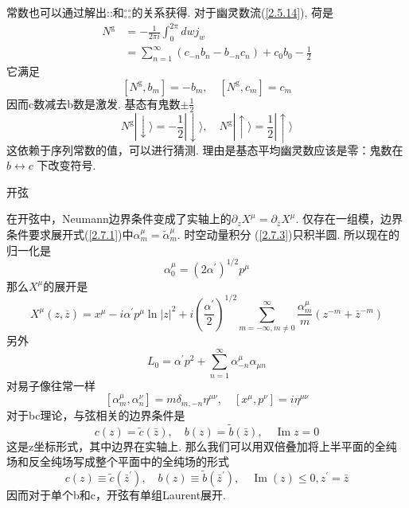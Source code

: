 常数也可以通过解出::和${}_\circ^\circ {}_\circ^\circ$的关系获得. 对于幽灵数流(\ref{2.5.14}),  荷是
\begin{equation}\label{2.7.22}
\begin{aligned}
N^{\mathrm{g}} &=-\frac{1}{2 \pi i} \int_{0}^{2 \pi} d w j_{w} \\
&=\sum_{n=1}^{\infty}\left(c_{-n} b_{n}-b_{-n} c_{n}\right)+c_{0} b_{0}-\frac{1}{2}
\end{aligned}
\end{equation}
它满足
\begin{equation}
\left[N^{\mathrm{g}}, b_{m}\right]=-b_{m}, \quad\left[N^{\mathrm{g}}, c_{m}\right]=c_{m}
\end{equation}
因而c数减去b数是激发. 基态有鬼数$\pm \frac{1}{2}$
\begin{equation}
N^{\mathrm{g}}|\downarrow\rangle=-\frac{1}{2}|\downarrow\rangle, \quad N^{\mathrm{g}}|\uparrow\rangle=\frac{1}{2}|\uparrow\rangle
\end{equation}
这依赖于序列常数的值，可以进行猜测. 理由是基态平均幽灵数应该是零：鬼数在$b \leftrightarrow c$ 下改变符号.\\

\centerline{\Large 开弦}
在开弦中，Neumann边界条件变成了实轴上的$\partial_z X^{\mu}=\partial_{\bar{z}} X^{\mu}$.
仅存在一组模，边界条件要求展开式(\ref{2.7.1})中$\alpha_{m}^{\mu}=\tilde{\alpha}_{m}^{\mu}$. 时空动量积分 (\ref{2.7.3})只积半圆. 所以现在的归一化是
\begin{equation}
\alpha_{0}^{\mu}=\left(2 \alpha^{\prime}\right)^{1 / 2} p^{\mu}
\end{equation}
那么$X^\mu$的展开是
\begin{equation}
X^{\mu}(z, \bar{z})=x^{\mu}-i \alpha^{\prime} p^{\mu} \ln |z|^{2}+i\left(\frac{\alpha^{\prime}}{2}\right)^{1 / 2} \sum_{m=-\infty , m \neq 0}^{\infty} \frac{\alpha_{m}^{\mu}}{m}\left(z^{-m}+\bar{z}^{-m}\right)
\end{equation}
另外
\begin{equation}
L_{0}=\alpha^{\prime} p^{2}+\sum_{n=1}^{\infty} \alpha_{-n}^{\mu} \alpha_{\mu n}
\end{equation}
对易子像往常一样
\begin{equation}
\left[\alpha_{m}^{\mu}, \alpha_{n}^{\nu}\right]=m \delta_{m,-n} \eta^{\mu \nu}, \quad\left[x^{\mu}, p^{\nu}\right]=i \eta^{\mu \nu}
\end{equation}
对于bc理论，与弦相关的边界条件是
\begin{equation}
c(z)=\tilde{c}(\bar{z}), \quad b(z)=\tilde{b}(\bar{z}), \quad \operatorname{Im} z=0
\end{equation}
这是z坐标形式，其中边界在实轴上. 那么我们可以用双倍叠加将上半平面的全纯场和反全纯场写成整个平面中的全纯场的形式
\begin{equation}
c(z) \equiv \tilde{c}\left(\bar{z}^{\prime}\right), \quad b(z) \equiv \tilde{b}\left(\bar{z}^{\prime}\right), \quad \operatorname{Im}(z) \leq 0, z^{\prime}=\bar{z}
\end{equation}
因而对于单个b和c，开弦有单组Laurent展开.


